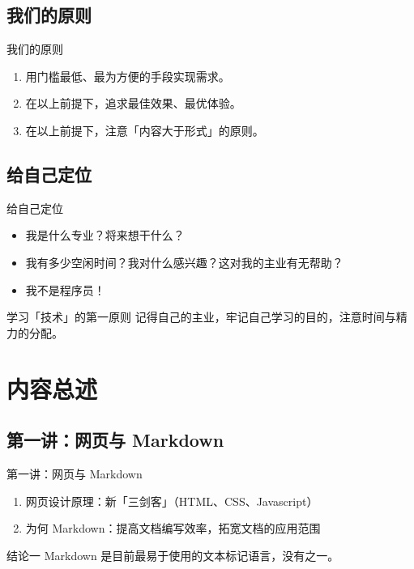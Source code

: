 \documentclass{beamer}
\begin{document}
\subsection{我们的原则}
\begin{frame}{我们的原则}
\begin{enumerate}
    \item 用门槛最低、最为方便的手段实现需求。
    \item 在以上前提下，追求最佳效果、最优体验。
    \item 在以上前提下，注意「内容大于形式」的原则。
\end{enumerate}
\end{frame}

\subsection{给自己定位}
\begin{frame}{给自己定位}
\begin{itemize}
    \item 我是什么专业？将来想干什么？
    \item 我有多少空闲时间？我对什么感兴趣？这对我的主业有无帮助？
    \item 我不是程序员！
\end{itemize}

\begin{alertblock}{学习「技术」的第一原则}
记得自己的主业，牢记自己学习的目的，注意时间与精力的分配。
\end{alertblock}

\end{frame}

\section{内容总述}

\subsection{第一讲：网页与 Markdown}
\begin{frame}{第一讲：网页与 Markdown}
\begin{enumerate}
    \item 网页设计原理：新「三剑客」（HTML、CSS、Javascript）
    \item 为何 Markdown：提高文档编写效率，拓宽文档的应用范围
\end{enumerate}

\begin{block}{结论一}
Markdown 是目前最易于使用的文本标记语言，没有之一。
\end{block}

\end{frame}
\end{document}
